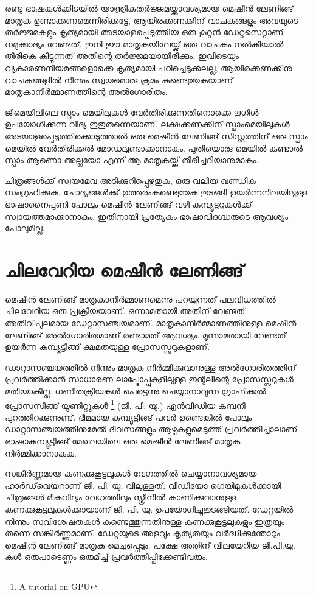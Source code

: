 \documentclass[12pt,twoside,a4paper]{article}
\begin{document}
രണ്ടു ഭാഷകൾക്കിടയിൽ യാന്ത്രികതർജ്ജമയ്ക്കാവശ്യമായ മെഷീൻ ലേണിങ്ങ് മാതൃക ഉണ്ടാക്കണമെന്നിരിക്കട്ടേ, ആയിരക്കണക്കിന് വാചകങ്ങളും അവയുടെ തർജ്ജമകളും കൃത്യമായി അടയാളപ്പെടുത്തിയ ഒരു കൂറ്റൻ ഡേറ്റസെറ്റാണ് നമുക്കാദ്യം വേണ്ടത്. ഇനി ഈ മാതൃകയിലേയ്ക്ക്  ഒരു വാചകം നൽകിയാൽ തിരികെ കിട്ടുന്നത് അതിന്റെ തർജ്ജമയായിരിക്കും. ഇവിടെയും വ്യകാരണനിയമങ്ങളൊക്കെ കൃത്യമായി പഠിച്ചെടുക്കലല്ല, ആയിരക്കണക്കിനു വാചകങ്ങളിൽ നിന്നും സ്വയമൊരു ക്രമം കണ്ടെത്തുകയാണ് മാതൃകാനിർമ്മാണത്തിന്റെ അൽഗോരിതം.

ജിമെയിലിലെ സ്പാം മെയിലുകൾ വേർതിരിക്കുന്നതിനൊക്കെ ഗൂഗിൾ ഉപയോഗിക്കുന്ന വിദ്യ ഇതുതന്നെയാണ്. ലക്ഷക്കണക്കിന് സ്പാംമെയിലുകൾ അടയാളപ്പെടുത്തിക്കൊടുത്താൽ ഒരു മെഷീൻ ലേണിങ്ങ് സിസ്റ്റത്തിന് ഒരു സ്പാം മെയിൽ വേർതിരിക്കൽ മോഡലുണ്ടാക്കാനാകും. പുതിയൊരു മെയിൽ കണ്ടാൽ സ്പാം ആണൊ അല്ലയോ എന്ന് ആ മാതൃകയ്ക്ക് തിരിച്ചറിയാനുമാകും.

ചിത്രങ്ങൾക്ക് സ്വയമേവ അടിക്കുറിപ്പെഴുതുക, ഒരു വലിയ ഖണ്ഡിക സംഗ്രഹിക്കുക, ചോദ്യങ്ങൾക്ക് ഉത്തരംകണ്ടെത്തുക തുടങ്ങി ഉയർന്നനിലയിലുള്ള ഭാഷാനൈപുണി പോലും മെഷീൻ ലേണിങ്ങ് വഴി കമ്പ്യൂട്ടറുകൾക്ക് സ്വായത്തമാക്കാനാകും. ഇതിനായി പ്രത്യേകം ഭാഷാവിദഗ്ദ്ധരുടെ ആവശ്യം പോലുമില്ല.

\section{ചിലവേറിയ മെഷീൻ ലേണിങ്ങ്}

മെഷീൻ ലേണിങ്ങ് മാതൃകാനിർമ്മാണമെന്നു പറയുന്നത് പലവിധത്തിൽ ചിലവേറിയ ഒരു പ്രക്രിയയാണ്. ഒന്നാമതായി അതിന് വേണ്ടത് അതിവിപുലമായ ഡേറ്റാസഞ്ചയമാണ്. മാതൃകാനിർമ്മാണത്തിനുള്ള മെഷീൻ ലേണിങ്ങ് അൽഗോരിതമാണ് രണ്ടാമത് ആവശ്യം. മൂന്നാമതായി വേണ്ടത് ഉയർന്ന കമ്പ്യൂട്ടിങ്ങ് ക്ഷമതയുള്ള പ്രോസസ്സറുകളാണ്.

ഡാറ്റാസഞ്ചയത്തിൽ നിന്നും മാതൃക നിർമ്മിക്കുവാനുള്ള അൽഗോരിതത്തിന് പ്രവർത്തിക്കാൻ സാധാരണ ലാപ്ടോപ്പുകളിലുള്ള ഇന്റലിന്റെ പ്രോസസ്സറുകൾ മതിയാകില്ല. ഗണിതക്രിയകൾ പെട്ടെന്നു ചെയ്യാനാവുന്ന ഗ്രാഫിക്കൽ പ്രോസസിങ്ങ് യൂണിറ്റുകൾ \footnote{\href{https://course.fast.ai/gpu_tutorial.html}{A tutorial on GPU}} (ജി. പി. യു.) എൻവിഡിയ കമ്പനി പുറത്തിറക്കുന്നുണ്ട്. ഭീമമായ കമ്പ്യൂട്ടിങ്ങ് പവർ ഉണ്ടെങ്കിൽ പോലും ഡാറ്റാസഞ്ചയത്തിനുമേൽ ദിവസങ്ങളും ആഴ്ചകളുമെടുത്ത് പ്രവർത്തിച്ചാലാണ് ഭാഷാകമ്പ്യൂട്ടിങ്ങ് മേഖലയിലെ ഒരു മെഷീൻ ലേണിങ്ങ് മാതൃക നിർമ്മിക്കാനാകുക.

സങ്കീർണ്ണമായ കണക്കുകൂട്ടലുകൾ വേഗത്തിൽ ചെയ്യാനാവശ്യമായ ഹാർഡ്‌വെയറാണ് ജി. പി. യു. വിലുള്ളത്. വീഡിയോ ഗെയിമുകൾക്കായി ചിത്രങ്ങൾ മികവിലും വേഗത്തിലും സ്ക്രീനിൽ കാണിക്കുവാനുള്ള കണക്കുകൂട്ടലുകൾക്കായാണ് ജി. പി. യു. ഉപയോഗിച്ചുതുടങ്ങിയത്. ഡേറ്റയിൽ നിന്നും സവിശേഷതകൾ കണ്ടെത്തുന്നതിനുള്ള കണക്കുകൂട്ടലുകളും ഇത്രയും തന്നെ സങ്കീർണ്ണമാണ്. ഡേറ്റയുടെ അളവും കൃത്യതയും വർദ്ധിക്കുന്തോറും മെഷീൻ ലേണിങ്ങ് മാതൃക മെച്ചപ്പെടും. പക്ഷേ അതിന് വിലയേറിയ ജി.പി.യു. കൾ ഒരുപാടെണ്ണം ഒരുമിച്ച് പ്രവർത്തിപ്പിക്കേണ്ടിവരും.
\end{document}
